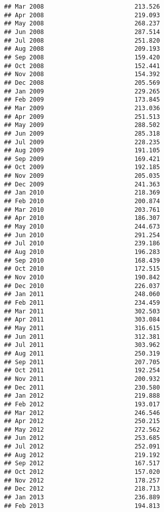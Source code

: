 \documentclass[
]{article}
\begin{document}
\begin{verbatim}
## Mar 2008                         213.526
## Apr 2008                         219.093
## May 2008                         268.237
## Jun 2008                         287.514
## Jul 2008                         251.820
## Aug 2008                         209.193
## Sep 2008                         159.420
## Oct 2008                         152.441
## Nov 2008                         154.392
## Dec 2008                         205.569
## Jan 2009                         229.265
## Feb 2009                         173.845
## Mar 2009                         213.036
## Apr 2009                         251.513
## May 2009                         288.502
## Jun 2009                         285.318
## Jul 2009                         228.235
## Aug 2009                         191.105
## Sep 2009                         169.421
## Oct 2009                         192.185
## Nov 2009                         205.035
## Dec 2009                         241.363
## Jan 2010                         218.369
## Feb 2010                         200.874
## Mar 2010                         203.761
## Apr 2010                         186.307
## May 2010                         244.673
## Jun 2010                         291.254
## Jul 2010                         239.186
## Aug 2010                         196.283
## Sep 2010                         168.439
## Oct 2010                         172.515
## Nov 2010                         190.842
## Dec 2010                         226.037
## Jan 2011                         248.060
## Feb 2011                         234.459
## Mar 2011                         302.503
## Apr 2011                         303.084
## May 2011                         316.615
## Jun 2011                         312.381
## Jul 2011                         303.962
## Aug 2011                         250.319
## Sep 2011                         207.705
## Oct 2011                         192.254
## Nov 2011                         200.932
## Dec 2011                         230.580
## Jan 2012                         219.888
## Feb 2012                         193.017
## Mar 2012                         246.546
## Apr 2012                         250.215
## May 2012                         272.562
## Jun 2012                         253.685
## Jul 2012                         252.091
## Aug 2012                         219.192
## Sep 2012                         167.517
## Oct 2012                         157.020
## Nov 2012                         178.257
## Dec 2012                         218.713
## Jan 2013                         236.889
## Feb 2013                         194.813

\end{verbatim}
\end{document}
